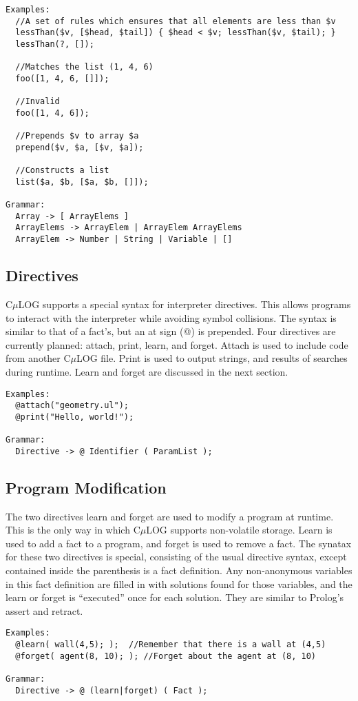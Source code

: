\documentclass[onecolumn,titlepage]{article}
\begin{document}
\begin{verbatim}
Examples:
  //A set of rules which ensures that all elements are less than $v
  lessThan($v, [$head, $tail]) { $head < $v; lessThan($v, $tail); }
  lessThan(?, []);

  //Matches the list (1, 4, 6)
  foo([1, 4, 6, []]);

  //Invalid
  foo([1, 4, 6]);

  //Prepends $v to array $a
  prepend($v, $a, [$v, $a]);

  //Constructs a list
  list($a, $b, [$a, $b, []]);

Grammar:
  Array -> [ ArrayElems ]
  ArrayElems -> ArrayElem | ArrayElem ArrayElems
  ArrayElem -> Number | String | Variable | []
\end{verbatim}

\subsection{Directives}
C$\mu$LOG supports a special syntax for interpreter directives.  This allows programs to
interact with the interpreter while avoiding symbol collisions. The syntax is similar
to that of a fact's, but an at sign (@) is prepended. Four directives are currently planned:
attach, print, learn, and forget.  Attach is used to include code from another C$\mu$LOG file.
Print is used to output strings, and results of searches during runtime.  Learn and forget
are discussed in the next section.
\begin{verbatim}
Examples:
  @attach("geometry.ul");
  @print("Hello, world!");

Grammar:
  Directive -> @ Identifier ( ParamList ); 
\end{verbatim}

\subsection{Program Modification}
The two directives learn and forget are used to modify a program at runtime.  This
is the only way in which C$\mu$LOG supports non-volatile storage.  Learn is used to
add a fact to a program, and forget is used to remove a fact.  The synatax for these
two directives is special, consisting of the usual directive syntax, except contained
inside the parenthesis is a fact definition.  Any non-anonymous variables in this fact
definition are filled in with solutions found for those variables, and the learn or
forget is ``executed'' once for each solution.  They are similar to Prolog's assert and retract.
\begin{verbatim}
Examples:
  @learn( wall(4,5); );  //Remember that there is a wall at (4,5)
  @forget( agent(8, 10); ); //Forget about the agent at (8, 10)

Grammar:
  Directive -> @ (learn|forget) ( Fact ); 
\end{verbatim}
\end{document}
